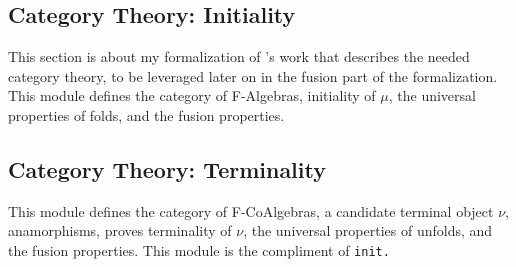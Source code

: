 \subsection{Category Theory: Initiality}
This section is about my formalization of \cite{Harper2011}'s work that describes the needed category theory, to be leveraged later on in the fusion part of the formalization.
This module defines the category of F-Algebras, initiality of $\mu$, the universal properties of folds, and the fusion properties.



\subsection{Category Theory: Terminality}
This module defines the category of F-CoAlgebras, a candidate terminal object $\nu$, anamorphisms, proves terminality of $\nu$, the universal properties of unfolds, and the fusion properties.
This module is the compliment of \tt{init}.


